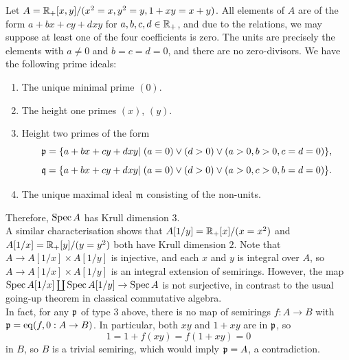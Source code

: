 \begin{example}\label{exmp:badclosed}
Let $A=\mathbb{R}_{+}[x,y]/(x^2=x,y^2=y,1+xy=x+y)$. All elements of $A$ are of the form $a + bx + cy + dxy$ for $a,b,c,d \in \mathbb{R}_{+}$, 
and due to the relations, we may suppose at least one of the four coefficients is zero. The units are precisely the elements with $a \neq 0$ and $b=c=d=0$,
and there are no zero-divisors. We have the following prime ideals:
\begin{enumerate}
\item[(1)] The unique minimal prime $(0)$.
\item[(2)] The height one primes $(x)$, $(y)$.
\item[(3)] Height two primes of the form 
\[\mathfrak{p}=\{a + bx + cy + dxy| \; (a=0) \lor (d>0) \lor (a>0, b>0, c=d=0)\},\]
\[\mathfrak{q}=\{a + bx + cy + dxy| \; (a=0) \lor (d>0) \lor (a>0, c>0, b=d=0)\}.\]
\item[(4)] The unique maximal ideal $\mathfrak{m}$ consisting of the non-units.
\end{enumerate}
Therefore, $\operatorname{Spec}{A}$ has Krull dimension $3$.\\
\indent A similar characterisation shows that $A[1/y]=\mathbb{R}_{+}[x]/(x=x^2)$ and $A[1/x]=\mathbb{R}_{+}[y]/(y=y^2)$ 
both have Krull dimension $2$. Note that $A \to A[1/x] \times A[1/y]$ is injective, and each $x$ and $y$ is integral over $A$, 
so $A \to A[1/x] \times A[1/y]$ is an integral extension of semirings. However, the map $\operatorname{Spec}{A[1/x]} \coprod \operatorname{Spec}{A[1/y]} \rightarrow \operatorname{Spec}{A}$ 
is not surjective, in contrast to the usual going-up theorem in classical commutative algebra.\\
\indent In fact, for any $\mathfrak{p}$ of type $3$ above, there is no map of semirings $f:A \to B$ with $\mathfrak{p} = \operatorname{eq}(f,0:A \rightarrow B)$. 
In particular, both $xy$ and $1+xy$ are in $\mathfrak{p}$, so
\[1=1+f(xy)=f(1+xy)=0\]
in $B$, so $B$ is a trivial semiring, which would imply $\mathfrak{p}= A$, a contradiction.
\end{example}
